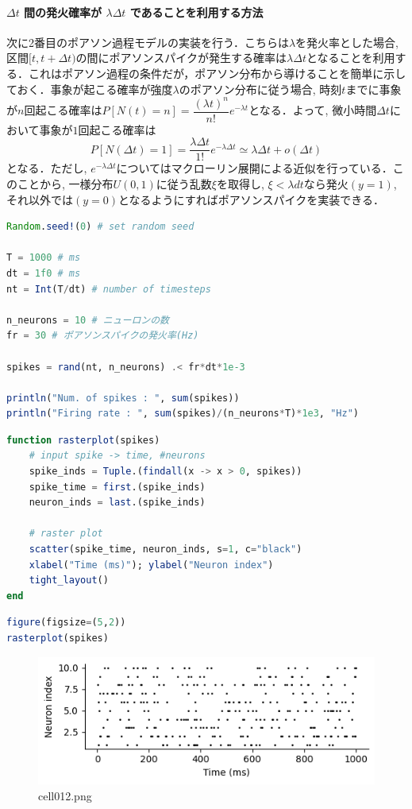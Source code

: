 \paragraph{$\Delta t$ 間の発火確率が $\lambda\Delta t$ であることを利用する方法}
次に2番目のポアソン過程モデルの実装を行う．こちらは$\lambda$を発火率とした場合, 区間$[t, t+\Delta t)$の間にポアソンスパイクが発生する確率は$\lambda \Delta t$となることを利用する．これはポアソン過程の条件だが，ポアソン分布から導けることを簡単に示しておく．事象が起こる確率が強度$\lambda$のポアソン分布に従う場合, 時刻$t$までに事象が$n$回起こる確率は$P[N(t)=n]=\dfrac{(\lambda t)^{n}}{n !} e^{-\lambda t}$となる．よって, 微小時間$\Delta t$において事象が$1$回起こる確率は
\begin{equation}
P[N(\Delta t)=1]=\dfrac{\lambda \Delta t}{1 !} e^{-\lambda \Delta t}\simeq \lambda \Delta t+o(\Delta t)
\end{equation}
となる．ただし, $e^{-\lambda \Delta t}$についてはマクローリン展開による近似を行っている．このことから, 一様分布$U(0,1)$に従う乱数$\xi$を取得し, $\xi<\lambda dt$なら発火$(y=1)$, それ以外では$(y=0)$となるようにすればポアソンスパイクを実装できる．
\begin{lstlisting}[language=julia]
Random.seed!(0) # set random seed

T = 1000 # ms
dt = 1f0 # ms
nt = Int(T/dt) # number of timesteps

n_neurons = 10 # ニューロンの数
fr = 30 # ポアソンスパイクの発火率(Hz)

spikes = rand(nt, n_neurons) .< fr*dt*1e-3

println("Num. of spikes : ", sum(spikes))
println("Firing rate : ", sum(spikes)/(n_neurons*T)*1e3, "Hz")
\end{lstlisting}
\begin{lstlisting}[language=julia]
function rasterplot(spikes)
    # input spike -> time, #neurons
    spike_inds = Tuple.(findall(x -> x > 0, spikes))
    spike_time = first.(spike_inds)
    neuron_inds = last.(spike_inds)
    
    # raster plot
    scatter(spike_time, neuron_inds, s=1, c="black")
    xlabel("Time (ms)"); ylabel("Neuron index")
    tight_layout()
end
\end{lstlisting}
\begin{lstlisting}[language=julia]
figure(figsize=(5,2))
rasterplot(spikes)
\end{lstlisting}
\begin{figure}[ht]
	\centering
	\includegraphics[scale=0.8, max width=\linewidth]{./fig/neuron-model/isi/cell012.png}
	\caption{cell012.png}
	\label{cell012.png}
\end{figure}
